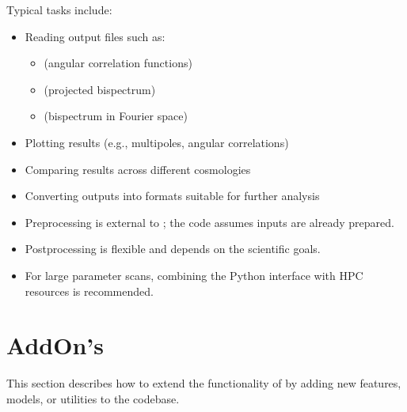 \documentclass[letterpaper,10pt,english]{sphinxmanual}
\begin{document}
\sphinxAtStartPar
Typical tasks include:
\begin{itemize}
\item {} 
\sphinxAtStartPar
Reading output files such as:
\begin{itemize}
\item {} 
\sphinxAtStartPar
{} (angular correlation functions)

\item {} 
\sphinxAtStartPar
{} (projected bispectrum)

\item {} 
\sphinxAtStartPar
{} (bispectrum in Fourier space)

\end{itemize}

\item {} 
\sphinxAtStartPar
Plotting results (e.g., multipoles, angular correlations)

\item {} 
\sphinxAtStartPar
Comparing results across different cosmologies

\item {} 
\sphinxAtStartPar
Converting outputs into formats suitable for further analysis

\end{itemize}

\sphinxAtStartPar
{}
\begin{itemize}
\item {} 
\sphinxAtStartPar
Pre\sphinxhyphen{}processing is external to ; the code assumes inputs are already prepared.

\item {} 
\sphinxAtStartPar
Post\sphinxhyphen{}processing is flexible and depends on the scientific goals.

\item {} 
\sphinxAtStartPar
For large parameter scans, combining the Python interface with HPC resources is recommended.

\end{itemize}

\sphinxstepscope


\chapter{AddOn’s}
\label{\detokenize{addons:addon-s}}\label{\detokenize{addons::doc}}
\sphinxAtStartPar
This section describes how to extend the functionality of  by adding new features, models, or utilities to the codebase.
\end{document}
